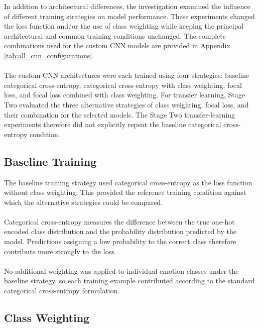 \documentclass[12pt, a4paper]{report}
\let\oldsubsection\subsection
\renewcommand{\subsection}{%
    \Needspace{6\baselineskip}%
    \oldsubsection
}
\begin{document}
			In addition to architectural differences, the investigation examined the influence of different training strategies on model performance. These experiments changed the loss function and/or the use of class weighting while keeping the principal architectural and common training conditions unchanged. The complete combinations used for the custom CNN models are provided in Appendix \ref{tab:all_cnn_configurations}.\\\\
			The custom CNN architectures were each trained using four strategies: baseline categorical cross-entropy, categorical cross-entropy with class weighting, focal loss, and focal loss combined with class weighting. For transfer learning, Stage Two evaluated the three alternative strategies of class weighting, focal loss, and their combination for the selected models. The Stage Two transfer-learning experiments therefore did not explicitly repeat the baseline categorical cross-entropy condition.
			
			\subsection{Baseline Training}
				
				The baseline training strategy used categorical cross-entropy as the loss function without class weighting. This provided the reference training condition against which the alternative strategies could be compared.\\\\
				Categorical cross-entropy measures the difference between the true one-hot encoded class distribution and the probability distribution predicted by the model. Predictions assigning a low probability to the correct class therefore contribute more strongly to the loss.\\\\
				No additional weighting was applied to individual emotion classes under the baseline strategy, so each training example contributed according to the standard categorical cross-entropy formulation.
				
			\subsection{Class Weighting}
				
\end{document}
